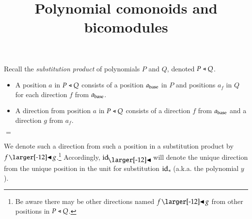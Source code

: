 \documentclass{amsart}
\title{Polynomial comonoids and bicomodules}
\begin{document}
\maketitle

\iffalse
  A \emph{polynomial}\footnote{The name refers to a correspondence
    between families of sets and sums of powers, illustrated by the
    example
    ${2y^4 + y^2 + y \leftrightarrow
      \{\{\ast,\ast,\ast,\ast\},\{\ast,\ast,\ast,\ast\},\{\ast,\ast\},
      \{\ast\}\}}$.} is an indexed family of sets.

  The indexes of sets are called \emph{positions}, and the members of
  indexed sets are called \emph{directions}.

  We will visualize a polynomial as a collection of corollas.


  A corolla is a node with arrows pointing out from it; this denotes a
  position and the directions from it.
\fi

Recall the \emph{substitution product} of polynomials $P$ and $Q$, denoted
$P \sub Q$.

\iffalse
  From polynomials $P$ and $Q$, we can form a new polynomial
  of all the possible two-story trees built by stacking $Q$
  corollas atop a $P$ corolla. This is called the \emph{substitution
    product}, denoted $P \sub Q$.
\fi

\begin{itemize}
\item A position $a$ in $P \sub Q$ consists of a position $a_{\mathrm{base}}$ in
  $P$ and positions $a_f$ in $Q$ for each direction $f$ from
  $a_{\mathrm{base}}$.
\item A direction from position $a$ in $P \sub Q$ consists of a
  direction $f$ from $a_{\mathrm{base}}$ and a direction $g$ from $a_f$.
\end{itemize}
\vspace{.5em}
\begin{center}
  
  \qquad
  {\Large$=$}
  \quad
  
\end{center}
\vspace{1em}

We denote such a direction from such a position in a substitution
product by $f \subd g$.\footnote{Be aware there may be other
  directions named $f \subd g$ from other positions in
  $P \sub Q$.} Accordingly, $\idsubd$ will denote the unique direction
from the unique position in the unit for substitution $\mathrm{id}_{\mathrel{\triangleleft}}$
(a.k.a. the polynomial $y$).\iffalse\footnote{Given directions $f$,
    $g$, and $h$ respectively belonging to polynomials $P$, $Q$, and
    $R$, directions of the form $(f \subd g)\subd h$ belonging to
    $(P \sub Q) \sub R$ and directions of the form
    $f \subd (g \subd h)$ belonging to $P \sub (Q \sub R)$ are
    identified under the relevant monoidal coherence
    isomorphism. Hence brackets can be omitted.

  Similarly, for any direction $f$ belonging to a polynomial $P$, we
  have that $\idsubd \subd f$ and $f \subd \idsubd$ (respectively
  belonging to $\idsub \sub P$ and $P \sub \idsub$) are both
  canonically identified with $f$.}\fi
\end{document}
